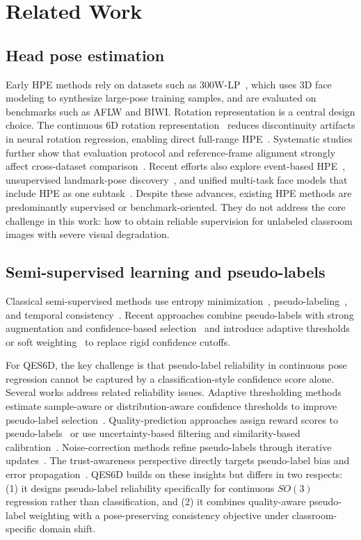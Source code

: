 \documentclass[preprint,12pt]{elsarticle}
\begin{document}
\section{Related Work}
\subsection{Head pose estimation}
Early HPE methods rely on datasets such as 300W-LP~\cite{zhu2016face}, which uses 3D face modeling to synthesize large-pose training samples, and are evaluated on benchmarks such as AFLW and BIWI. Rotation representation is a central design choice. The continuous 6D rotation representation~\cite{zhou2019continuity} reduces discontinuity artifacts in neural rotation regression, enabling direct full-range HPE~\cite{hempel2022sixdrepnet,hempel2024tip}. Systematic studies further show that evaluation protocol and reference-frame alignment strongly affect cross-dataset comparison~\cite{cobo2024pr}. Recent efforts also explore event-based HPE~\cite{yuan2024eventhpe}, unsupervised landmark-pose discovery~\cite{tourani2025cvpr}, and unified multi-task face models that include HPE as one subtask~\cite{narayan2025iccv}. Despite these advances, existing HPE methods are predominantly supervised or benchmark-oriented. They do not address the core challenge in this work: how to obtain reliable supervision for unlabeled classroom images with severe visual degradation.

\subsection{Semi-supervised learning and pseudo-labels}
Classical semi-supervised methods use entropy minimization~\cite{grandvalet2005entropy}, pseudo-labeling~\cite{lee2013pseudo}, and temporal consistency~\cite{laine2017temporal,tarvainen2017mean}. Recent approaches combine pseudo-labels with strong augmentation and confidence-based selection~\cite{sohn2020fixmatch,xie2020uda} and introduce adaptive thresholds~\cite{flexmatch2021,freematch2023} or soft weighting~\cite{softmatch2023} to replace rigid confidence cutoffs.

For QES6D, the key challenge is that pseudo-label reliability in continuous pose regression cannot be captured by a classification-style confidence score alone. Several works address related reliability issues. Adaptive thresholding methods estimate sample-aware or distribution-aware confidence thresholds to improve pseudo-label selection~\cite{metathreshold2024,dmlfixmatch2024}. Quality-prediction approaches assign reward scores to pseudo-labels~\cite{semireward2024} or use uncertainty-based filtering and similarity-based calibration~\cite{simregmatch2024}. Noise-correction methods refine pseudo-labels through iterative updates~\cite{jin2025kbs,plr2025}. The trust-awareness perspective directly targets pseudo-label bias and error propagation~\cite{trustmatch2025}. QES6D builds on these insights but differs in two respects: (1) it designs pseudo-label reliability specifically for continuous $SO(3)$ regression rather than classification, and (2) it combines quality-aware pseudo-label weighting with a pose-preserving consistency objective under classroom-specific domain shift.
\end{document}
